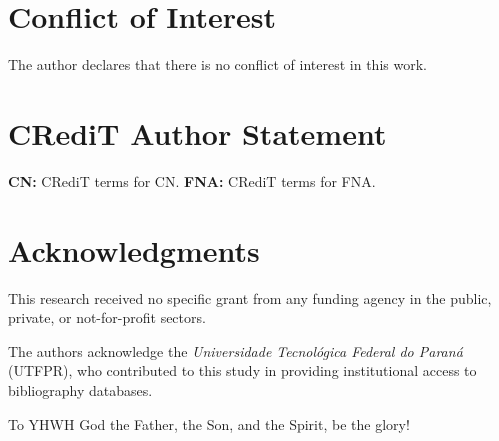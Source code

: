 
\section*{Conflict of Interest}

    The author declares that there is no conflict of interest in this work.



\section*{CRediT Author Statement}

    \textbf{CN:} CRediT terms for CN. \textbf{FNA:} CRediT terms for FNA.



\section*{Acknowledgments}

    This research received no specific grant from any funding agency in the public, private,  or
    not-for-profit sectors.

    The authors acknowledge the \textit{Universidade Tecnológica Federal do Paraná} (UTFPR), who
    contributed to this study in providing institutional access to bibliography databases.

    To YHWH God the Father, the Son, and the Spirit, be the glory!



